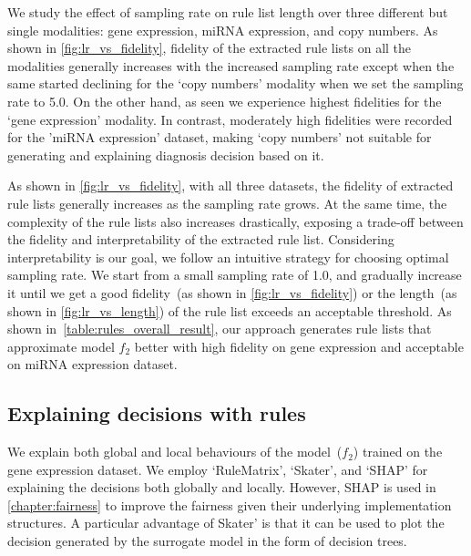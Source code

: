 \hspace*{3.5mm} We study the effect of sampling rate on rule list length over three different but single modalities: gene expression, miRNA expression, and copy numbers. 
As shown in \cref{fig:lr_vs_fidelity}, fidelity of the extracted rule lists on all the modalities generally increases with the increased sampling rate except when the same started declining for the `copy numbers' modality when we set the sampling rate to 5.0. On the other hand, as seen we experience highest fidelities for the `gene expression' modality. In contrast,  moderately high fidelities were recorded for the 'miRNA expression' dataset, making `copy numbers' not suitable for generating and explaining diagnosis decision based on it. 

\hspace*{3.5mm} As shown in \cref{fig:lr_vs_fidelity}, with all three datasets, the fidelity of extracted rule lists generally increases as the sampling rate grows. At the same time, the complexity of the rule lists also increases drastically, exposing a trade-off between the fidelity and interpretability of the extracted rule list. Considering interpretability is our goal, we follow an intuitive strategy for choosing optimal sampling rate. We  start from a small sampling rate of 1.0, and gradually increase it until we get a good fidelity~(as shown in \cref{fig:lr_vs_fidelity}) or the length~(as shown in \cref{fig:lr_vs_length}) of the rule list exceeds an acceptable threshold. As shown in~\cref{table:rules_overall_result}, our approach generates rule lists that approximate model $f_2$ better with high fidelity on gene expression and acceptable on miRNA expression dataset. 

\subsection{Explaining decisions with rules}
We explain both global and local behaviours of the model~($f_2$) trained on the gene expression dataset. We employ `RuleMatrix', `Skater', and `SHAP' for explaining the decisions both globally and locally. However, SHAP is used in \cref{chapter:fairness} to improve the fairness given their underlying implementation structures. A particular advantage of Skater' is that it can be used to plot the decision generated by the surrogate model in the form of decision trees. 

